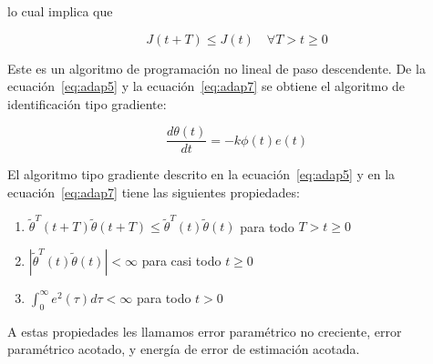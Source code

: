             lo cual implica que

            \begin{equation}
                J(t + T) \le J(t) \quad \forall T > t \ge 0
            \end{equation}

            Este es un algoritmo de programación no lineal de paso descendente.
            De la ecuación~\ref{eq:adap5} y la ecuación~\ref{eq:adap7} se obtiene el algoritmo de identificación tipo gradiente:

            \begin{equation} \label{eq:adap7}
                \frac{d \theta(t)}{dt} = -k \phi(t)e(t)
            \end{equation}


            \begin{lema}
                El algoritmo tipo gradiente descrito en la ecuación~\ref{eq:adap5} y en la ecuación~\ref{eq:adap7} tiene las siguientes propiedades:

                \begin{enumerate}
                    \item $\tilde{\theta}^T(t + T) \tilde{\theta}(t + T) \le \tilde{\theta}^T(t) \tilde{\theta}(t)$ para todo $T > t \ge 0$
                    \item $\left| \tilde{\theta}^T(t) \tilde{\theta}(t) \right| < \infty$ para casi todo $t \ge 0$
                    \item $\int_0^{\infty} e^2(\tau) d\tau < \infty$ para todo $t > 0$
                \end{enumerate}

                A estas propiedades les llamamos error paramétrico no creciente, error paramétrico acotado, y energía de error de estimación acotada.
            \end{lema}

